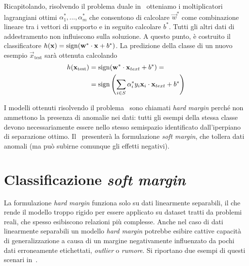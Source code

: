 Ricapitolando, risolvendo il problema duale in~ otteniamo i moltiplicatori lagrangiani ottimi $\alpha_1^*, ..., \alpha_m^*$ che consentono di calcolare $\Vec{w}^*$ come combinazione lineare tra i vettori di supporto e in seguito calcolare $b^*$. 
Tutti gli altri dati di addestramento non influiscono sulla soluzione. 
A questo punto, è costruito il classificatore $h(\Vec{x}) = \sign(\Vec{w}^*\cdot \Vec{x} +b^*)$.
La predizione della classe di un nuovo esempio $\Vec{x}_\text{test}$ sarà ottenuta calcolando 
\begin{align*}
h(\Vec{x}_\text{test})  &= \sign(\Vec{w}^*\cdot\vec{x}_{text} +b^*) =\\
                        &= \sign\left(\sum_{i\in S} \alpha_i^*y_i \vec{x}_i \cdot \vec{x}_{text} + b^*\right)
\end{align*}

I modelli ottenuti risolvendo il problema~ sono chiamati \emph{hard margin} perché non ammettono la presenza di anomalie nei dati: tutti gli esempi della stessa classe devono necessariamente essere nello stesso semispazio identificato dall'iperpiano di separazione ottimo. Il~ presenterà la formulazione \emph{soft margin}, che tollera dati anomali (ma può subirne comunque gli effetti negativi). 

\section{Classificazione \emph{soft margin}}\label{sec:soft_margin_classifier}
La formulazione \emph{hard margin} funziona solo su dati linearmente separabili, il che rende il modello troppo rigido per essere applicato su dataset tratti da problemi reali, che spesso esibiscono relazioni più complesse. 
Anche nel caso di dati linearmente separabili un modello \emph{hard margin} potrebbe esibire cattive capacità di generalizzazione a causa di un margine negativamente influenzato da pochi dati erroneamente etichettati, \emph{outlier} o \emph{rumore}.
Si riportano due esempi di questi scenari in~.

